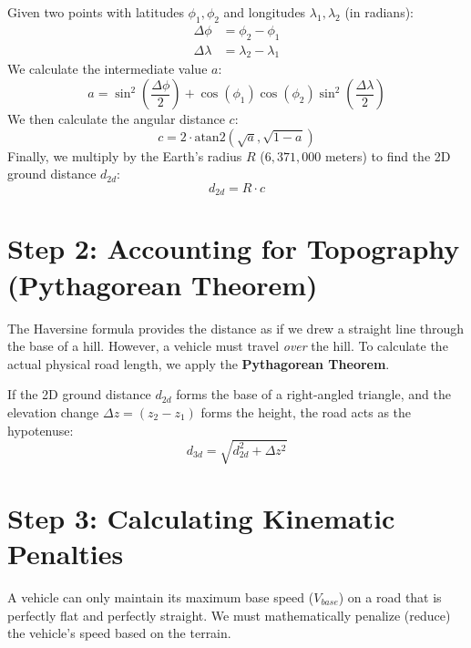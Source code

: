 \documentclass[12pt, a4paper]{article}
\begin{document}
Given two points with latitudes $\phi_1, \phi_2$ and longitudes $\lambda_1, \lambda_2$ (in radians):
\begin{align}
    \Delta\phi &= \phi_2 - \phi_1 \\
    \Delta\lambda &= \lambda_2 - \lambda_1
\end{align}
We calculate the intermediate value $a$:
\begin{equation}
    a = \sin^2\left(\frac{\Delta\phi}{2}\right) + \cos(\phi_1)\cos(\phi_2)\sin^2\left(\frac{\Delta\lambda}{2}\right)
\end{equation}
We then calculate the angular distance $c$:
\begin{equation}
    c = 2 \cdot \text{atan2}\left(\sqrt{a}, \sqrt{1-a}\right)
\end{equation}
Finally, we multiply by the Earth's radius $R$ ($6,371,000$ meters) to find the 2D ground distance $d_{2d}$:
\begin{equation}
    d_{2d} = R \cdot c
\end{equation}

\section{Step 2: Accounting for Topography (Pythagorean Theorem)}
The Haversine formula provides the distance as if we drew a straight line through the base of a hill. However, a vehicle must travel \textit{over} the hill. To calculate the actual physical road length, we apply the \textbf{Pythagorean Theorem}.

If the 2D ground distance $d_{2d}$ forms the base of a right-angled triangle, and the elevation change $\Delta z = (z_2 - z_1)$ forms the height, the road acts as the hypotenuse:
\begin{equation}
    d_{3d} = \sqrt{d_{2d}^2 + \Delta z^2}
\end{equation}

\section{Step 3: Calculating Kinematic Penalties}
A vehicle can only maintain its maximum base speed ($V_{base}$) on a road that is perfectly flat and perfectly straight. We must mathematically penalize (reduce) the vehicle's speed based on the terrain.
\end{document}
